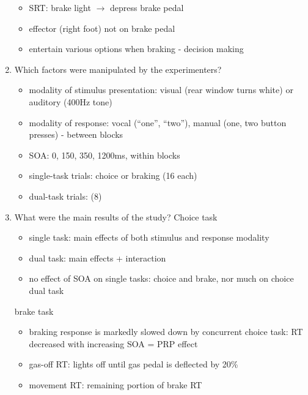 \documentclass[12pt,english]{scrartcl}
\begin{document}
\begin{enumerate}
\color{blue}
 \begin{itemize}
 \item SRT: brake light $\rightarrow$ depress brake pedal
 \item effector (right foot) not on brake pedal
 \item entertain various options when braking - decision making
 \end{itemize}
  \color{black}


\item Which factors were manipulated by the experimenters?
\color{blue}
 \begin{itemize}
 \item modality of stimulus presentation: visual (rear window turns white) or auditory (400Hz tone)
 \item modality of response: vocal (``one'', ``two''), manual (one, two button presses) - between blocks
 \item SOA: 0, 150, 350, 1200ms, within blocks
 \item single-task trials: choice or braking (16 each)
 \item dual-task trials: (8)
 \end{itemize}
  \color{black}


\item What were the main results of the study?
\color{blue}
Choice task
 \begin{itemize}
 \item single task: main effects of both stimulus and response modality
 \item dual task: main effects + interaction
 \item no effect of SOA on single tasks: choice and brake, nor much on choice dual task 
 \end{itemize}
brake task 
 \begin{itemize}
 \item braking response is markedly slowed down by concurrent choice task: RT decreased with increasing SOA = PRP effect
 \item gas-off RT: lights off until gas pedal is deflected by 20\%
 \item movement RT: remaining portion of brake RT
 \end{itemize}
  \color{black}


\end{enumerate}
\end{document}
